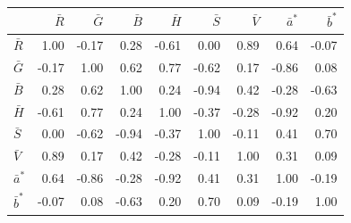 \scriptsize
\begin{tabular}{lrrrrrrrr}
\toprule
 & $\bar R$ & $\bar G$ & $\bar B$ & $\bar H$ & $\bar S$ & $\bar V$ & $\bar a^*$ & $\bar b^*$ \\
\midrule
$\bar R$ & 1.00 & -0.17 & 0.28 & -0.61 & 0.00 & 0.89 & 0.64 & -0.07 \\
$\bar G$ & -0.17 & 1.00 & 0.62 & 0.77 & -0.62 & 0.17 & -0.86 & 0.08 \\
$\bar B$ & 0.28 & 0.62 & 1.00 & 0.24 & -0.94 & 0.42 & -0.28 & -0.63 \\
$\bar H$ & -0.61 & 0.77 & 0.24 & 1.00 & -0.37 & -0.28 & -0.92 & 0.20 \\
$\bar S$ & 0.00 & -0.62 & -0.94 & -0.37 & 1.00 & -0.11 & 0.41 & 0.70 \\
$\bar V$ & 0.89 & 0.17 & 0.42 & -0.28 & -0.11 & 1.00 & 0.31 & 0.09 \\
$\bar a^*$ & 0.64 & -0.86 & -0.28 & -0.92 & 0.41 & 0.31 & 1.00 & -0.19 \\
$\bar b^*$ & -0.07 & 0.08 & -0.63 & 0.20 & 0.70 & 0.09 & -0.19 & 1.00 \\
\bottomrule
\end{tabular}
